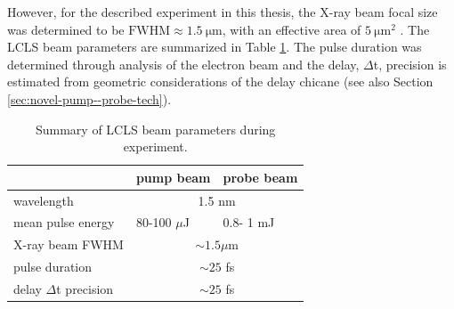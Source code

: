 %
However, for the described experiment in this thesis, the X-ray beam focal size was determined to be $\text{FWHM}\approx \SI{1.5}{\micro\meter}$, with an effective area of $\SI{5}{\micro\meter\squared}$ \citep{Bucher-2016-Unpublished}. The LCLS beam parameters are summarized in Table \ref{tab:beam-params}. The pulse duration was determined through analysis of the electron beam and the delay, $\Delta$t, precision is estimated from geometric considerations of the delay chicane (see also Section \ref{sec:novel-pump--probe-tech}).
\begin{table}
	\centering
		\begin{tabular}{ | l | l | l | }
		\hline
			 & pump beam & probe beam  \\ \hline
			wavelength & \multicolumn{2}{|c|}{1.5 nm} \\ \hline
			mean pulse energy & 80-100 $\mu$J & 0.8- 1 mJ \\ \hline
			X-ray beam FWHM & \multicolumn{2}{|c|}{$\sim 1.5 \mu$m} \\ \hline
			pulse duration & \multicolumn{2}{|c|}{$\sim 25$ fs} \\ \hline
			delay $\Delta$t precision & \multicolumn{2}{|c|}{$\sim 25$ fs} \\ \hline
		\end{tabular}
	\caption{Summary of LCLS beam parameters during experiment.}
	\label{tab:beam-params}
\end{table}
%
%
%
